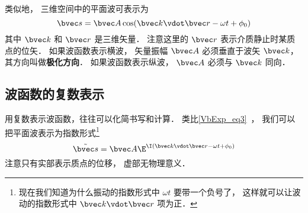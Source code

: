 类似地， 三维空间中的平面波可表示为
\begin{equation}
\bvec s = \bvec A \cos(\bvec k \vdot \bvec r - \omega t + \phi_0)
\end{equation}
其中 $\bvec k$ 和 $\bvec r$ 是三维矢量． 注意这里的 $\bvec r$ 表示介质静止时某质点的位矢． 如果波函数表示横波， 矢量振幅 $\bvec A$ 必须垂直于波矢 $\bvec k$， 其方向叫做\textbf{极化方向}． 如果波函数表示纵波， $\bvec A$ 必须与 $\bvec k$ 同向．

\subsection{波函数的复数表示}

用复数表示波函数，往往可以化简书写和计算． 类比\autoref{VbExp_eq3}~， 我们可以把平面波表示为指数形式\footnote{现在我们知道为什么振动的指数形式中 $\omega t$ 要带一个负号了， 这样就可以让波动的指数形式中 $\bvec k\vdot \bvec r$ 项为正．}
\begin{equation}
\tilde {\bvec s} = \bvec A \E^{\I( \bvec k \vdot \bvec r - \omega t + \phi_0)}
\end{equation}
注意只有实部表示质点的位移， 虚部无物理意义．


